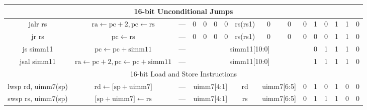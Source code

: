 \documentclass[a4paper,10pt]{article}
\begin{document}
\begin{landscape}
\begin{longtable}[c]{|c|c|@{}c@{}|@{}c@{}|@{}c@{}|@{}c@{}|@{}c@{}|@{}c@{}|@{}c@{}|@{}c@{}|@{}c@{}|@{}c@{}|@{}c@{}|@{}c@{}|@{}c@{}|@{}c@{}|@{}c@{}|@{}c@{}|@{}c@{}|@{}c@{}|@{}c@{}|@{}c@{}|@{}c@{}|@{}c@{}|@{}c@{}|@{}c@{}|}
\hline
\multicolumn{26}{|c|}{16-bit Unconditional Jumps}                                                                                                                                                                                                                                                             \\\hline
jalr rs               & $\mathrm{ra} \leftarrow \mathrm{pc} + 2, \mathrm{pc} \leftarrow \mathrm{rs}$ & \multicolumn{8}{c|}{---}                                   & 0      & 0    & 0    & 0   & \multicolumn{4}{c|}{rs(rs1)} & 0              & 0              & 0 & 1   & 0   & 1 & 1 & 0 \\
jr rs                 & $\mathrm{pc} \leftarrow \mathrm{rs}$ & \multicolumn{8}{c|}{---}                                   & 0      & 0    & 0    & 0   & \multicolumn{4}{c|}{rs(rs1)} & 0              & 0              & 0 & 0   & 0   & 1 & 1 & 0 \\
js simm11             & $\mathrm{pc} \leftarrow \mathrm{pc} + \mathrm{simm11}$ & \multicolumn{8}{c|}{---}                                   & \multicolumn{11}{c|}{simm11{[}10:0{]}}                                                                        & 0   & 1   & 1 & 1 & 0 \\
jsal simm11           & $\mathrm{ra} \leftarrow \mathrm{pc} + 2, \mathrm{pc} \leftarrow \mathrm{pc} + \mathrm{simm11}$ & \multicolumn{8}{c|}{---}                                   & \multicolumn{11}{c|}{simm11{[}10:0{]}}                                                                        & 1   & 1   & 1 & 1 & 0 \\

\hline
\multicolumn{26}{|c|}{16-bit Load and Store Instructions}                                                                                                                                                                                                                                                             \\\hline
lwsp rd, uimm7(sp)    & $\mathrm{rd} \leftarrow {[}\mathrm{sp} + \mathrm{uimm7}{]}$ & \multicolumn{8}{c|}{---}                                   & \multicolumn{4}{c|}{uimm7{[}4:1{]}} & \multicolumn{4}{c|}{rd}      & \multicolumn{2}{c|}{uimm7{[}6:5{]}}  & 0   & 1   & 0   & 1 & 0 & 0 \\
swsp rs, uimm7(sp)    & ${[}\mathrm{sp} + \mathrm{uimm7}{]} \leftarrow \mathrm{rs}$ & \multicolumn{8}{c|}{---}                                   & \multicolumn{4}{c|}{uimm7{[}4:1{]}} & \multicolumn{4}{c|}{rs}      & \multicolumn{2}{c|}{uimm7{[}6:5{]}}  & 0   & 1   & 1   & 1 & 0 & 0 \\


\end{longtable}
\end{landscape}
\end{document}
